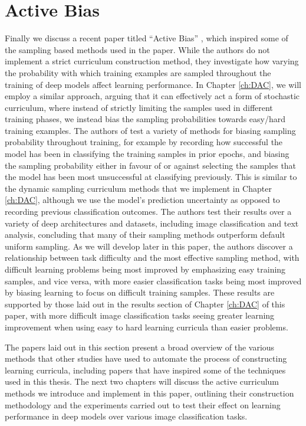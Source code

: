 \section{Active Bias}
Finally we discuss a recent paper titled ``Active Bias'' \cite{Chang18}, which inspired some of the sampling based methods used in the paper. While the authors do not implement a strict curriculum construction method, they investigate how varying the probability with which training examples are sampled throughout the training of deep models affect learning performance. In Chapter \ref{ch:DAC}, we will employ a similar approach, arguing that it can effectively act a form of stochastic curriculum, where instead of strictly limiting the samples used in different training phases, we instead bias the sampling probabilities towards easy/hard training examples. The authors of \cite{Chang18} test a variety of methods for biasing sampling probability throughout training, for example by recording how successful the model has been in classifying the training samples in prior epochs, and biasing the sampling probability either in favour of or against selecting the samples that the model has been most unsuccessful at classifying previously. This is similar to the dynamic sampling curriculum methods that we implement in Chapter \ref{ch:DAC}, although we use the model's prediction uncertainty as opposed to recording previous classification outcomes. The authors test their results over a variety of deep architectures and datasets, including image classification and text analysis, concluding that many of their sampling methods outperform default uniform sampling. As we will develop later in this paper, the authors discover a relationship between task difficulty and the most effective sampling method, with difficult learning problems being most improved by emphasizing easy training samples, and vice versa, with more easier classification tasks being most improved by biasing learning to focus on difficult training samples. These results are supported by those laid out in the results section of Chapter \ref{ch:DAC} of this paper, with more difficult image classification tasks seeing greater learning improvement when using easy to hard learning curricula than easier problems. 

The papers laid out in this section present a broad overview of the various methods that other studies have used to automate the process of constructing learning curricula, including papers that have inspired some of the techniques used in this thesis. The next two chapters will discuss the active curriculum methods we introduce and implement in this paper, outlining their construction methodology and the experiments carried out to test their effect on learning performance in deep models over various image classification tasks.


